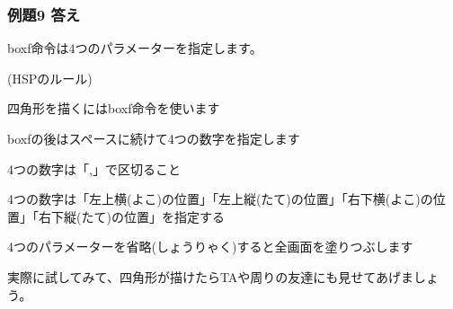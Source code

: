 \subsubsection*{例題9 答え}

boxf命令は4つのパラメーターを指定します。

\begin{description}
    \item (HSPのルール)
\end{description}

\begin{description}
    \item 四角形を描くにはboxf命令を使います
    \item boxfの後はスペースに続けて4つの数字を指定します
    \item 4つの数字は「,」で区切ること
    \item 4つの数字は「左上横(よこ)の位置」「左上縦(たて)の位置」「右下横(よこ)の位置」「右下縦(たて)の位置」を指定する
    \item 4つのパラメーターを省略(しょうりゃく)すると全画面を塗りつぶします
\end{description}

実際に試してみて、四角形が描けたらTAや周りの友達にも見せてあげましょう。